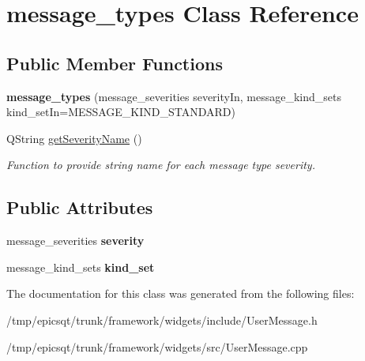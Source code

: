 \hypertarget{classmessage__types}{
\section{message\_\-types Class Reference}
\label{classmessage__types}
}
\subsection*{Public Member Functions}
\begin{DoxyCompactItemize}
\item 
\hypertarget{classmessage__types_a2014b738fdf5f7a84561b2837fb5da1f}{
{\bfseries message\_\-types} (message\_\-severities severityIn, message\_\-kind\_\-sets kind\_\-setIn=MESSAGE\_\-KIND\_\-STANDARD)}
\label{classmessage__types_a2014b738fdf5f7a84561b2837fb5da1f}

\item 
\hypertarget{classmessage__types_a07f6deb90c205ac15514b6ccdebc007d}{
QString \hyperlink{classmessage__types_a07f6deb90c205ac15514b6ccdebc007d}{getSeverityName} ()}
\label{classmessage__types_a07f6deb90c205ac15514b6ccdebc007d}

\begin{DoxyCompactList}\small\item\em Function to provide string name for each message type severity. \end{DoxyCompactList}\end{DoxyCompactItemize}
\subsection*{Public Attributes}
\begin{DoxyCompactItemize}
\item 
\hypertarget{classmessage__types_a0b8f4af672670a810e90dc66a883b9c8}{
message\_\-severities {\bfseries severity}}
\label{classmessage__types_a0b8f4af672670a810e90dc66a883b9c8}

\item 
\hypertarget{classmessage__types_a7967011affb00d6db2d9b0e4842ba0ef}{
message\_\-kind\_\-sets {\bfseries kind\_\-set}}
\label{classmessage__types_a7967011affb00d6db2d9b0e4842ba0ef}

\end{DoxyCompactItemize}


The documentation for this class was generated from the following files:\begin{DoxyCompactItemize}
\item 
/tmp/epicsqt/trunk/framework/widgets/include/UserMessage.h\item 
/tmp/epicsqt/trunk/framework/widgets/src/UserMessage.cpp\end{DoxyCompactItemize}
